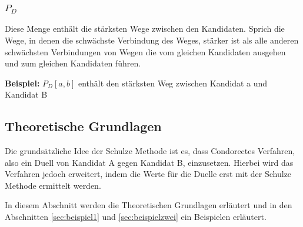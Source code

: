 \subsubsection{$P_{D}$}
\label{PD}
Diese Menge enthält die stärksten Wege zwischen den Kandidaten. Sprich die Wege, in denen die schwächste Verbindung des Weges, stärker ist als alle anderen schwächsten Verbindungen von Wegen die vom gleichen Kandidaten ausgehen und zum gleichen Kandidaten führen.

\textbf{Beispiel:} $P_{D}[a,b]$ enthält den stärksten Weg zwischen Kandidat a und Kandidat B

\subsection{Theoretische Grundlagen} 
\label{sec:theoretische Grundlagen}

Die grundsätzliche Idee der Schulze Methode ist es, dass Condorectes Verfahren, also ein Duell von Kandidat A gegen Kandidat B, einzusetzen. Hierbei wird das Verfahren jedoch erweitert, indem die Werte für die Duelle erst mit der Schulze Methode ermittelt werden.

In diesem Abschnitt werden die Theoretischen Grundlagen erläutert und in den Abschnitten \ref{sec:beispiel1} und  \ref{sec:beispielzwei} ein Beispielen erläutert.


